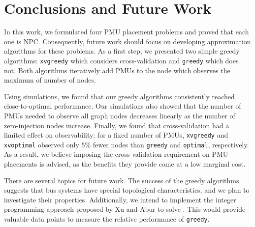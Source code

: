 \section{Conclusions and Future Work}
\label{sec:conclude}

In this work, we formulated four PMU placement problems and proved that each one is NPC. 
Consequently, future work should focus on developing approximation algorithms for these problems.  As a first step, we presented two simple greedy algorithms:
{\tt xvgreedy} which considers cross-validation and {\tt greedy} which does not.  Both algorithms iteratively add PMUs to the node which observes the maximum of number of nodes. 

Using simulations, we found that our greedy algorithms consistently reached close-to-optimal performance.  Our simulations also
showed that the number of PMUs needed to observe all graph nodes decreases linearly as the number of zero-injection nodes increase. Finally, we found
that cross-validation had a limited effect on observability: for a fixed number of PMUs, {\tt xvgreedy} and {\tt xvoptimal} observed only $5\%$ fewer nodes than
{\tt greedy} and {\tt optimal}, respectively. As a result, we believe imposing the cross-validation requirement on PMU placements is advised, as the benefits they provide come at a low marginal cost.

There are several topics for future work. The success of the greedy algorithms suggests that bus systems have special topological characteristics, 
and we plan to investigate their properties. Additionally, we intend to implement the integer programming approach proposed by Xu and Abur \cite{Xu04} to solve \fulls.  This would
provide valuable data points to measure the relative performance of {\tt greedy}.

